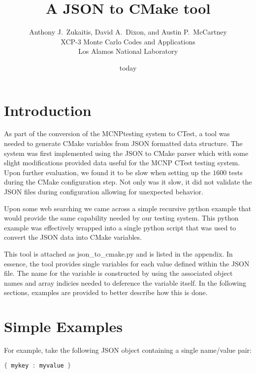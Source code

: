 \documentclass[12pt]{article}
\title{A JSON to CMake tool}
\author{ Anthony J.\ Zukaitis, David A.\ Dixon, and Austin P.\ McCartney \\
         XCP-3 Monte Carlo Codes and Applications \\
	 Los Alamos National Laboratory }
\date{today}
\begin{document}
\maketitle

\section{Introduction}

As part of the conversion of the MCNP\textregistered testing system to CTest\cite{mcnpctest}, a tool was needed to generate CMake variables
from JSON formatted data structure.  The system was first implemented using the JSON to CMake parser \cite{jsoncmake} which with some slight modifications provided data useful for the MCNP CTest testing system.  Upon further evaluation, we found it to be slow when setting up the $1600$ tests during the CMake configuration step.  Not only was it slow, it did not validate the JSON files during configuration allowing for unexpected behavior.   

Upon some web searching we came across a simple recursive python example that would provide the same capability needed by our testing system\cite{flatten}.  This python example was effectively wrapped into a single python script that was used to convert the JSON data into CMake variables.

This tool is attached as json\_to\_cmake.py and is listed in the appendix.  In essence, the tool provides single variables for each value defined within the JSON file. The name for the variable is constructed by using the associated object names and array indicies needed to deference the variable itself.  In the following sections, examples are provided to better describe how this is done.

\section{Simple Examples}
For example, take the following JSON object containing a single name/value pair:
\begin{lstlisting}[language=java,basicstyle=\tiny,frame=single,columns=fullflexible]
{ mykey : myvalue }
\end{lstlisting}
\end{document}
